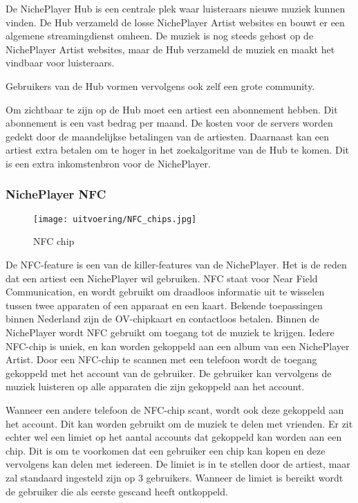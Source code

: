 De NichePlayer Hub is een centrale plek waar luisteraars nieuwe muziek kunnen vinden. De Hub verzameld de losse NichePlayer Artist websites en bouwt er een algemene streamingdienst omheen. De muziek is nog steeds gehost op de NichePlayer Artist websites, maar de Hub verzameld de muziek en maakt het vindbaar voor luisteraars.

Gebruikers van de Hub vormen vervolgens ook zelf een grote community. 

Om zichtbaar te zijn op de Hub moet een artiest een abonnement hebben. Dit abonnement is een vast bedrag per maand. De kosten voor de servers worden gedekt door de maandelijkse betalingen van de artiesten. Daarnaast kan een artiest extra betalen om te hoger in het zoekalgoritme van de Hub te komen. Dit is een extra inkomstenbron voor de NichePlayer.

\subsubsection*{NichePlayer NFC}
\begin{wrapfigure}{r}{0.25\textwidth}
  \centering
  \texttt{[image: uitvoering/NFC\_chips.jpg]}
  \caption{NFC chip}
  \label{fig:uitvoering:NFC_chip}
\end{wrapfigure}
De NFC-feature is een van de killer-features van de NichePlayer. Het is de reden dat een artiest een NichePlayer wil gebruiken. NFC staat voor Near Field Communication, en wordt gebruikt om draadloos informatie uit te wisselen tussen twee apparaten of een apparaat en een kaart. Bekende toepassingen binnen Nederland zijn de OV-chipkaart en contactloos betalen. Binnen de NichePlayer wordt NFC gebruikt om toegang tot de muziek te krijgen. Iedere NFC-chip is uniek, en kan worden gekoppeld aan een album van een NichePlayer Artist. Door een NFC-chip te scannen met een telefoon wordt de toegang gekoppeld met het account van de gebruiker. De gebruiker kan vervolgens de muziek luisteren op alle apparaten die zijn gekoppeld aan het account.

Wanneer een andere telefoon de NFC-chip scant, wordt ook deze gekoppeld aan het account. Dit kan worden gebruikt om de muziek te delen met vrienden. Er zit echter wel een limiet op het aantal accounts dat gekoppeld kan worden aan een chip. Dit is om te voorkomen dat een gebruiker een chip kan kopen en deze vervolgens kan delen met iedereen. De limiet is in te stellen door de artiest, maar zal standaard ingesteld zijn op 3 gebruikers. Wanneer de limiet is bereikt wordt de gebruiker die als eerste gescand heeft ontkoppeld.

